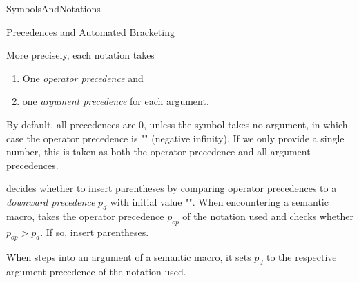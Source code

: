 \begin{smodule}[ns=https://github.com/slatex/sTeX/doc]{SymbolsAndNotations}
\begin{sfragment}{Precedences and Automated Bracketing}
    \begin{dangerbox}
        More precisely, each notation takes
        \begin{enumerate}
            \item One \emph{operator precedence} and
            \item one \emph{argument precedence} for each argument.
        \end{enumerate}
        By default, all precedences are $0$, unless the symbol takes
        no argument, in which case the operator precedence is 
        \stexcode"\neginfprec" (negative infinity). If we only provide a single number,
        this is taken as both the operator precedence and all
        argument precedences.

        \sTeX decides whether to insert parentheses by comparing
        operator precedences to a \emph{downward precedence}
        $p_d$ with initial value \stexcode"\infprec".
        When encountering a semantic macro, \sTeX takes the
        operator precedence $p_{op}$ of the notation used
        and checks whether $p_{op}>p_d$. If so, \sTeX insert parentheses.

        When \sTeX steps into an argument of a semantic macro,
        it sets $p_d$ to the respective argument precedence of
        the notation used.


\end{dangerbox}
\end{sfragment}
\end{smodule}

